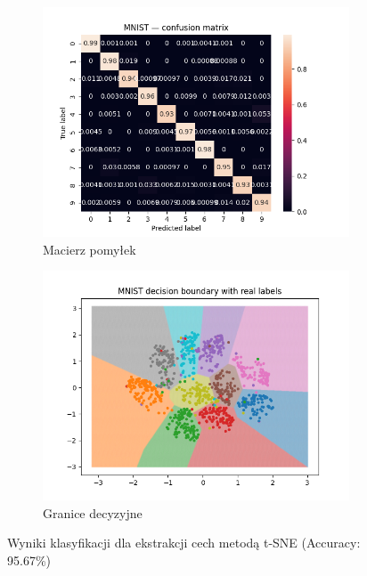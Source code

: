 \documentclass[10pt]{article}
\begin{document}
\begin{figure}[H]
    \centering
    \begin{subfigure}[t]{.5\textwidth}\centering
        \includegraphics[width=\linewidth]{img/mnist_tsne_cm.png}
        \caption{Macierz pomyłek}\label{fig:tsne-cm}
    \end{subfigure}
    \hspace{-3em}
    \begin{subfigure}[t]{.5\textwidth}\centering
        \includegraphics[width=\linewidth]{img/mnist_tsne_db.png}
        \caption{Granice decyzyjne}\label{fig:tsne-db}
    \end{subfigure}
    \caption{Wyniki klasyfikacji dla ekstrakcji cech metodą t-SNE (Accuracy: 95.67\%)}
\end{figure}
\end{document}
